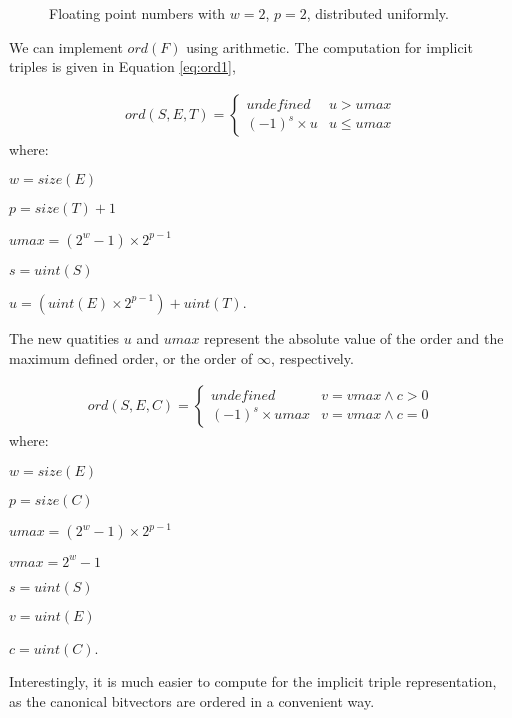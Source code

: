\documentclass[letterpaper,10pt]{article}
\begin{document}
\begin{figure}[t!]
 \centering
 \caption{Floating point numbers with $w=2$, $p=2$, distributed uniformly.} \label{fig:numberline2}
 \smallskip
\end{figure}

We can implement $ord(F)$ using arithmetic. The computation for implicit triples is given in Equation \ref{eq:ord1},

\begin{align} \label{eq:ord1}
 ord(S, E, T) = 
 \begin{cases}
  undefined       & u > umax\\
  (-1)^s \times u & u \leq umax
 \end{cases}
\end{align}
where:
\begin{description}
 \item $w = size(E)$
 \item $p = size(T) + 1$
 \item $umax = (2^w-1) \times 2^{p-1}$
 \item $s = uint(S)$
 \item $u = (uint(E) \times 2^{p-1}) + uint(T)$.
\end{description}

The new quatities $u$ and $umax$ represent the absolute value of the order and the maximum defined order, or the order of $\infty$, respectively.

\begin{align} \label{eq:ord2}
 ord(S, E, C) = 
 \begin{cases}
  undefined                                     & v = vmax \land c > 0\\
  (-1)^s \times umax                            & v = vmax \land c = 0
 \end{cases}
\end{align}
where:
\begin{description}
 \item $w = size(E)$
 \item $p = size(C)$
 \item $umax = (2^w-1) \times 2^{p-1}$
 \item $vmax = 2^w - 1$
 \item $s = uint(S)$
 \item $v = uint(E)$
 \item $c = uint(C)$.
\end{description}

Interestingly, it is much easier to compute for the implicit triple representation, as the canonical bitvectors are ordered in a convenient way.



\end{document}
